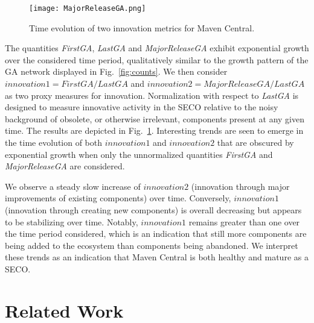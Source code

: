 \documentclass[10pt,conference]{IEEEtran}
\begin{document}
\begin{figure}
\centering
\texttt{[image: MajorReleaseGA.png]}
\caption{Time evolution of two innovation metrics for Maven Central.}
\label{fig:innovation}
\end{figure}

The quantities \textit{FirstGA}, \textit{LastGA} and \textit{MajorReleaseGA} exhibit exponential growth over the considered time period, qualitatively similar to the growth pattern of the GA network displayed in Fig.~\ref{fig:counts}. We then consider 
$innovation1=FirstGA/LastGA$ and $innovation2=MajorReleaseGA/LastGA$
as two proxy measures for innovation. Normalization with respect to \textit{LastGA} is designed to measure innovative activity in the SECO relative to the noisy background of obsolete, or otherwise irrelevant, components present at any
given time. The results are depicted in Fig.~\ref{fig:innovation}. Interesting trends are seen to emerge in the time evolution of both $innovation1$ and $innovation2$ that are obscured by exponential growth when only the unnormalized quantities \textit{FirstGA} and \textit{MajorReleaseGA} are considered.

We observe a steady slow increase of $innovation2$ (innovation through major improvements of existing components) over time. Conversely, $innovation1$ (innovation through creating new components) is overall decreasing but appears to be stabilizing over time. Notably, $innovation1$ remains greater than one over the time period considered, which is an indication that still more components are being added to the ecosystem than components being abandoned. We interpret these trends as an indication that Maven Central is both healthy and mature as a SECO. 

\section{Related Work}
\label{section:relatedwork}
\end{document}
